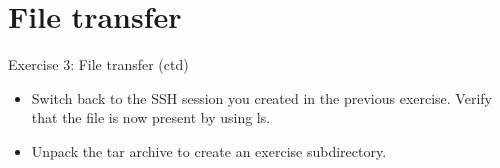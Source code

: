 \documentclass[handout]{beamer} %
\begin{document}
{    
\section{File transfer}
%
\begin{frame}{Exercise 3: File transfer (ctd)}
\begin{itemize}
\item{Switch back to the SSH session you created in the previous exercise. Verify that the file is now present by using \alert{ls}.}
\item{Unpack the tar archive to create an exercise subdirectory.}
\end{itemize}
\end{frame}
}    
\end{document}
